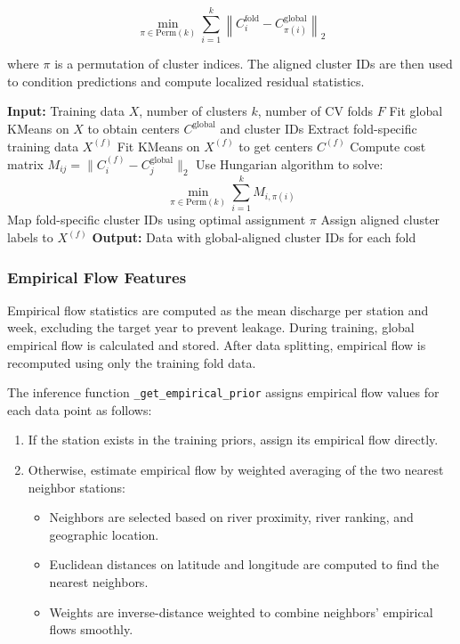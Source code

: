 \documentclass[a4paper,12pt]{article}
\begin{document}
\begin{equation}
\min_{\pi \in \text{Perm}(k)} \sum_{i=1}^{k} \left\| C^{\text{fold}}_i - C^{\text{global}}_{\pi(i)} \right\|_2
\end{equation}

where \( \pi \) is a permutation of cluster indices. The aligned cluster IDs are then used to condition predictions and compute localized residual statistics.

\begin{algorithm}[h!]
\caption{Data-Aware Global Clustering and Alignment}
\begin{algorithmic}[1]
\State \textbf{Input:} Training data \( X \), number of clusters \( k \), number of CV folds \( F \)
\State Fit global KMeans on \( X \) to obtain centers \( C^{\text{global}} \) and cluster IDs
    \State Extract fold-specific training data \( X^{(f)} \)
    \State Fit KMeans on \( X^{(f)} \) to get centers \( C^{(f)} \)
    \State Compute cost matrix \( M_{ij} = \lVert C^{(f)}_i - C^{\text{global}}_j \rVert_2 \)
    \State Use Hungarian algorithm to solve:
    \[
        \min_{\pi \in \text{Perm}(k)} \sum_{i=1}^{k} M_{i,\pi(i)}
    \]
    \State Map fold-specific cluster IDs using optimal assignment \( \pi \)
    \State Assign aligned cluster labels to \( X^{(f)} \)
\EndFor
\State \textbf{Output:} Data with global-aligned cluster IDs for each fold
\end{algorithmic}
\end{algorithm}

\subsubsection{Empirical Flow Features}
Empirical flow statistics are computed as the mean discharge per station and week, excluding the target year to prevent leakage. During training, global empirical flow is calculated and stored. After data splitting, empirical flow is recomputed using only the training fold data.

The inference function \texttt{\_get\_empirical\_prior} assigns empirical flow values for each data point as follows:

\begin{enumerate}
    \item If the station exists in the training priors, assign its empirical flow directly.
    \item Otherwise, estimate empirical flow by weighted averaging of the two nearest neighbor stations:
    \begin{itemize}
        \item Neighbors are selected based on river proximity, river ranking, and geographic location.
        \item Euclidean distances on latitude and longitude are computed to find the nearest neighbors.
        \item Weights are inverse-distance weighted to combine neighbors' empirical flows smoothly.
    \end{itemize}
\end{enumerate}
\end{document}
